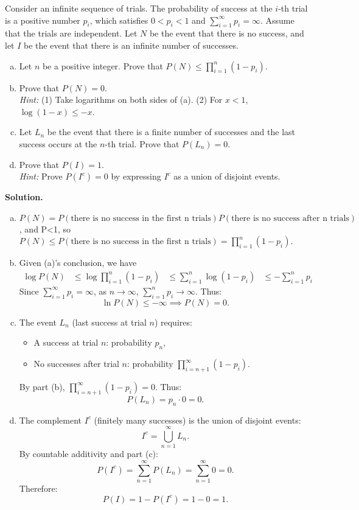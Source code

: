\documentclass{article}
\begin{document}
\begin{question}
Consider an infinite sequence of trials. The probability of success at the $i$-th trial is a positive number $p_i$, which satisfies $0 < p_i < 1$ and $\sum\limits_{i=1}^{\infty} p_i = \infty$. Assume that the trials are independent. Let $N$ be the event that there is no success, and let $I$ be the event that there is an infinite number of successes.

\begin{enumerate}[(a)]
    \item Let $n$ be a positive integer. Prove that $P(N) \leq \prod\limits_{i=1}^{n} (1 - p_i)$.
    \item Prove that $P(N) = 0$.\\
    \textit{Hint:} (1) Take logarithms on both sides of (a). (2) For $x < 1$, $\log (1 - x) \leq -x$.
    \item Let $L_n$ be the event that there is a finite number of successes and the last success occurs at the $n$-th trial. Prove that $P(L_n) = 0$.
    \item Prove that $P(I) = 1$.\\
    \textit{Hint:} Prove $P(I^c) = 0$ by expressing $I^c$ as a union of disjoint events.
\end{enumerate}
\end{question}

{\bf Solution.}
\begin{enumerate}[(a)]
    \item 
    $ P(N)=P(\text{there is no success in the first n trials})P(\text{there is no success after n trials})$, and P<1, so $P(N) \leq P(\text{there is no success in the first n trials})=\prod_{i=1}^{n}(1-p_i)$.
    \item Given (a)'s conclusion, we have 
    $$ \begin{align*}
        \log P(N) &\leq \log \prod_{i=1}^{n}(1-p_i)
        &\leq \sum_{i=1}^{n}\log (1-p_i)
        &\leq -\sum_{i=1}^{n}p_i 
    \end{align*} $$
    Since $ \sum_{i=1}^\infty p_i = \infty $, as $ n \to \infty $, $ \sum_{i=1}^n p_i \to \infty $. Thus:
    $$
    \ln P(N) \leq -\infty \implies P(N) = 0.
    $$
    \item The event $ L_n $ (last success at trial $ n $) requires:
        \begin{itemize}
        \item A success at trial $ n $: probability $ p_n $,
        \item No successes after trial $ n $: probability $ \prod_{i=n+1}^\infty (1 - p_i) $.
        \end{itemize}
        By part (b), $ \prod_{i=n+1}^\infty (1 - p_i) = 0 $. Thus:
        $$
        P(L_n) = p_n \cdot 0 = 0.
        $$
    \item The complement $ I^c $ (finitely many successes) is the union of disjoint events:
        $$
        I^c = \bigcup_{n=1}^\infty L_n.
        $$
        By countable additivity and part (c):
        $$
        P(I^c) = \sum_{n=1}^\infty P(L_n) = \sum_{n=1}^\infty 0 = 0.
        $$
        Therefore:
        $$
        P(I) = 1 - P(I^c) = 1 - 0 = 1.
        $$
\end{enumerate}
\end{document}
